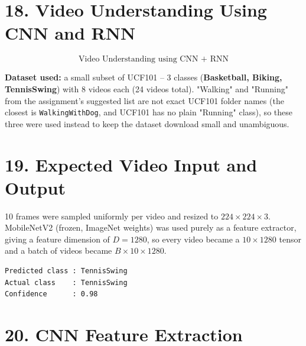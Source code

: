 \documentclass[10pt]{article}
\begin{document}
\section*{18. Video Understanding Using CNN and RNN}

\[
\boxed{\text{Video Understanding using CNN + RNN}}
\]

\begin{center}
\end{center}

\textbf{Dataset used:} a small subset of UCF101 -- 3 classes
(\textbf{Basketball, Biking, TennisSwing}) with 8 videos each (24 videos
total). "Walking" and "Running" from the assignment's suggested list are not
exact UCF101 folder names (the closest is \texttt{WalkingWithDog}, and UCF101
has no plain "Running" class), so these three were used instead to keep the
dataset download small and unambiguous.

\section*{19. Expected Video Input and Output}

10 frames were sampled uniformly per video and resized to $224\times224\times3$.
MobileNetV2 (frozen, ImageNet weights) was used purely as a feature
extractor, giving a feature dimension of $D=1280$, so every video became a
$10\times1280$ tensor and a batch of videos became $B\times10\times1280$.

\begin{verbatim}
Predicted class : TennisSwing
Actual class    : TennisSwing
Confidence      : 0.98
\end{verbatim}

\section*{20. CNN Feature Extraction}
\end{document}
